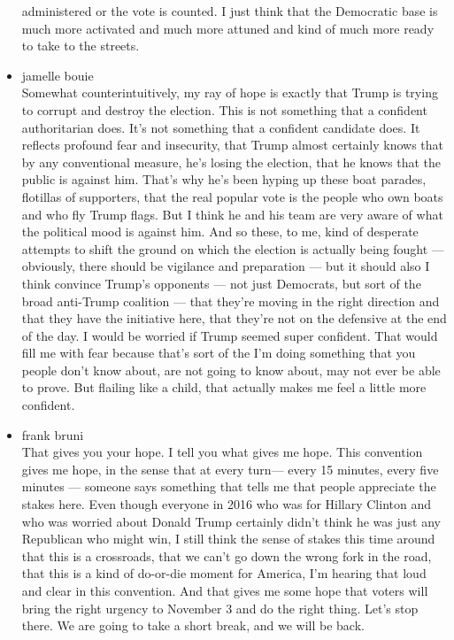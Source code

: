 \begin{itemize}
  administered or the vote is counted. I just think that the Democratic
  base is much more activated and much more attuned and kind of much
  more ready to take to the streets.
\item
  jamelle bouie\\
  Somewhat counterintuitively, my ray of hope is exactly that Trump is
  trying to corrupt and destroy the election. This is not something that
  a confident authoritarian does. It's not something that a confident
  candidate does. It reflects profound fear and insecurity, that Trump
  almost certainly knows that by any conventional measure, he's losing
  the election, that he knows that the public is against him. That's why
  he's been hyping up these boat parades, flotillas of supporters, that
  the real popular vote is the people who own boats and who fly Trump
  flags. But I think he and his team are very aware of what the
  political mood is against him. And so these, to me, kind of desperate
  attempts to shift the ground on which the election is actually being
  fought --- obviously, there should be vigilance and preparation ---
  but it should also I think convince Trump's opponents --- not just
  Democrats, but sort of the broad anti-Trump coalition --- that they're
  moving in the right direction and that they have the initiative here,
  that they're not on the defensive at the end of the day. I would be
  worried if Trump seemed super confident. That would fill me with fear
  because that's sort of the I'm doing something that you people don't
  know about, are not going to know about, may not ever be able to
  prove. But flailing like a child, that actually makes me feel a little
  more confident.
\item
  frank bruni\\
  That gives you your hope. I tell you what gives me hope. This
  convention gives me hope, in the sense that at every turn--- every 15
  minutes, every five minutes --- someone says something that tells me
  that people appreciate the stakes here. Even though everyone in 2016
  who was for Hillary Clinton and who was worried about Donald Trump
  certainly didn't think he was just any Republican who might win, I
  still think the sense of stakes this time around that this is a
  crossroads, that we can't go down the wrong fork in the road, that
  this is a kind of do-or-die moment for America, I'm hearing that loud
  and clear in this convention. And that gives me some hope that voters
  will bring the right urgency to November 3 and do the right thing.
  Let's stop there. We are going to take a short break, and we will be
  back.


\end{itemize}
